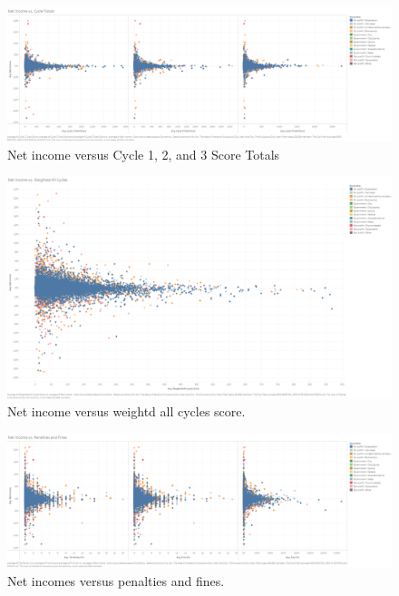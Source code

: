 \documentclass{article}
\theoremstyle{mytheoremstyle}
\theoremstyle{mytheoremstyle}
\theoremstyle{myproblemstyle}
\begin{document}
\begin{figure}[htbp]
\centering
\includegraphics[width=\linewidth]{Images/Net Income vs. Cycle Totals.png}
\caption{Net income versus Cycle 1, 2, and 3 Score Totals}
\label{fig:Standard Scaler Results}
\end{figure}

\begin{figure}[htbp]
\centering
\includegraphics[width=\linewidth]{Images/Net Income vs. Weighted All Cycles.png}
\caption{Net income versus weightd all cycles score.}
\label{fig:Standard Scaler Results}
\end{figure}

\begin{figure}[htbp]
\centering
\includegraphics[width=\linewidth]{Images/Net Income vs. Penalties and Fines.png}
\caption{Net incomes versus penalties and fines.}
\label{fig:Standard Scaler Results}
\end{figure}
\end{document}
